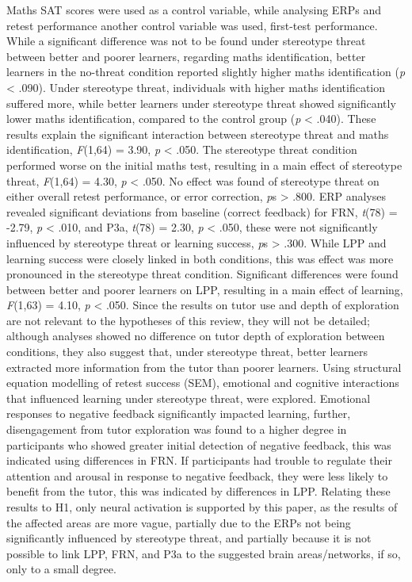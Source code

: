 \documentclass[
  stu,floatsintext]{apa7}
\begin{document}
Maths SAT scores were used as a control variable, while analysing ERPs and retest performance another control variable was used, first-test performance.\\
While a significant difference was not to be found under stereotype threat between better and poorer learners, regarding maths identification, better learners in the no-threat condition reported slightly higher maths identification (\emph{p} \textless{} .090).
Under stereotype threat, individuals with higher maths identification suffered more, while better learners under stereotype threat showed significantly lower maths identification, compared to the control group (\emph{p} \textless{} .040).
These results explain the significant interaction between stereotype threat and maths identification, \emph{F}(1,64) = 3.90, \emph{p} \textless{} .050.
The stereotype threat condition performed worse on the initial maths test, resulting in a main effect of stereotype threat, \emph{F}(1,64) = 4.30, \emph{p} \textless{} .050.
No effect was found of stereotype threat on either overall retest performance, or error correction, \emph{p}s \textgreater{} .800.
ERP analyses revealed significant deviations from baseline (correct feedback) for FRN, \emph{t}(78) = -2.79, \emph{p} \textless{} .010, and P3a, \emph{t}(78) = 2.30, \emph{p} \textless{} .050, these were not significantly influenced by stereotype threat or learning success, \emph{p}s \textgreater{} .300.
While LPP and learning success were closely linked in both conditions, this was effect was more pronounced in the stereotype threat condition.
Significant differences were found between better and poorer learners on LPP, resulting in a main effect of learning, \emph{F}(1,63) = 4.10, \emph{p} \textless{} .050.
Since the results on tutor use and depth of exploration are not relevant to the hypotheses of this review, they will not be detailed; although analyses showed no difference on tutor depth of exploration between conditions, they also suggest that, under stereotype threat, better learners extracted more information from the tutor than poorer learners.
Using structural equation modelling of retest success (SEM), emotional and cognitive interactions that influenced learning under stereotype threat, were explored.
Emotional responses to negative feedback significantly impacted learning, further, disengagement from tutor exploration was found to a higher degree in participants who showed greater initial detection of negative feedback, this was indicated using differences in FRN.
If participants had trouble to regulate their attention and arousal in response to negative feedback, they were less likely to benefit from the tutor, this was indicated by differences in LPP.
Relating these results to H1, only neural activation is supported by this paper, as the results of the affected areas are more vague, partially due to the ERPs not being significantly influenced by stereotype threat, and partially because it is not possible to link LPP, FRN, and P3a to the suggested brain areas/networks, if so, only to a small degree.
\end{document}

